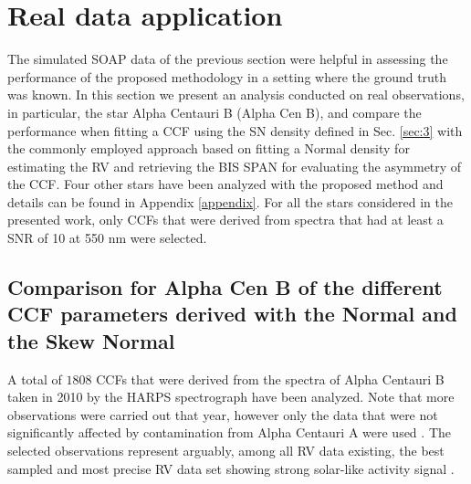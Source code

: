 \documentclass{aa}
\begin{document}
\section{Real data application} \label{sec:4}

The simulated SOAP data of the previous section were helpful in assessing the performance of the proposed methodology in a setting where the ground truth was known.  In this section we present an analysis conducted on real observations, in particular, the star Alpha Centauri B (Alpha Cen B), and compare the performance when fitting a CCF using the SN density defined in Sec. \ref{sec:3} with the commonly employed approach based on fitting a Normal density for estimating the RV and retrieving the BIS SPAN for evaluating the asymmetry of the CCF. 
Four other stars have been analyzed with the proposed method and details can be found in Appendix \ref{appendix}. 
For all the stars considered in the presented work, only CCFs that were derived from spectra that had at least a SNR of 10 at 550 nm were selected. 


\subsection{Comparison for Alpha Cen B of the different CCF parameters derived with the Normal and the Skew Normal} \label{sec:alphacentb}

A total of $1808$ CCFs that were derived from the spectra of Alpha Centauri B taken in 2010 by the HARPS spectrograph have been analyzed. Note that more observations were carried out that year, however only the data that were not significantly affected by contamination from Alpha Centauri A were used \citep[see][]{Dumusque-2012}. 
The selected observations represent arguably, among all RV data existing, the best sampled and most precise RV data set showing strong solar-like activity signal \citep{Thompson-2017, Dumusque-2012}.
\end{document}
